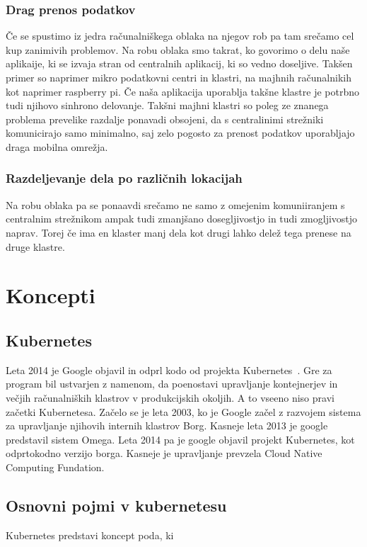 \documentclass[a4paper, 12pt]{book}
\begin{document}
\subsection{Drag prenos podatkov}
Če se spustimo iz jedra računalniškega oblaka na njegov rob pa tam srečamo cel kup zanimivih problemov. 
Na robu oblaka smo takrat, ko govorimo o delu naše aplikaije, ki se izvaja stran od centralnih aplikacij, ki so vedno doseljive.
Takšen primer so naprimer mikro podatkovni centri in klastri, na majhnih računalnikih kot naprimer raspberry pi.
Če naša aplikacija uporablja takšne klastre je potrbno tudi njihovo sinhrono delovanje.
Takšni majhni klastri so poleg ze znanega problema prevelike razdalje ponavadi obsojeni, da s centralinimi strežniki komunicirajo samo minimalno, saj zelo pogosto za prenost podatkov uporabljajo draga mobilna omrežja.

\subsection{Razdeljevanje dela po različnih lokacijah}
Na robu oblaka pa se ponaavdi srečamo ne samo z omejenim komuniiranjem s centralnim strežnikom ampak tudi zmanjšano dosegljivostjo in tudi zmogljivostjo naprav.
Torej če ima en klaster manj dela kot drugi lahko delež tega prenese na druge klastre.

\chapter{Koncepti}
\label{ch0}
\section{Kubernetes}
Leta 2014 je Google objavil in odprl kodo od projekta Kubernetes~\cite{whatiskubernetes}.
Gre za program bil ustvarjen z namenom, da poenostavi upravljanje kontejnerjev in večjih računalniških klastrov v produkcijskih okoljih.
A to vseeno niso pravi začetki Kubernetesa.
Začelo se je leta 2003, ko je Google začel z razvojem sistema za upravljanje njihovih internih klastrov Borg.
Kasneje leta 2013 je google predstavil sistem Omega.
Leta 2014 pa je google objavil projekt Kubernetes, kot odprtokodno verzijo borga. Kasneje je upravljanje prevzela Cloud Native Computing Fundation.

\section{Osnovni pojmi v kubernetesu}
Kubernetes predstavi koncept poda, ki 
\end{document}
